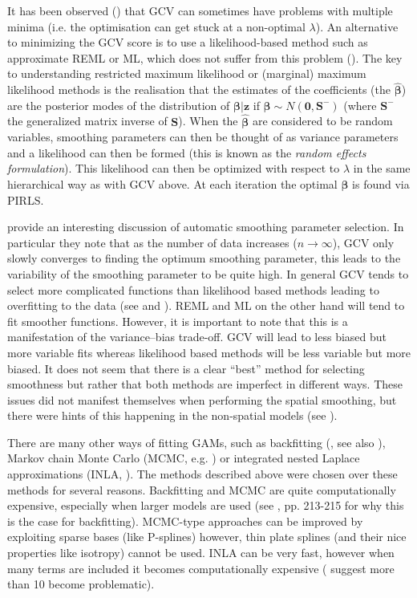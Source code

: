 It has been observed (\cite{reissogden}) that GCV can sometimes have problems with multiple minima (i.e. the optimisation can get stuck at a non-optimal $\lambda$). An alternative to minimizing the GCV score is to use a likelihood-based method such as approximate REML or ML, which does not suffer from this problem (\cite{remlpaper}). The key to understanding restricted maximum likelihood or (marginal) maximum likelihood methods is the realisation that the estimates of the coefficients (the $\bm{\hat{\beta}}$) are the posterior modes of the distribution of $\bm{\beta}|\mathbf{z}$ if $\bm{\beta} \sim N(\mathbf{0},\mathbf{S}^-)$ (where $\mathbf{S}^-$ the generalized matrix inverse of $\mathbf{S}$). When the $\bm{\hat{\beta}}$ are considered to be random variables, smoothing parameters can then be thought of as variance parameters and a likelihood can then be formed (this is known as the \textit{random effects formulation}).  This likelihood can then be optimized with respect to $\lambda$ in the same hierarchical way as with GCV above. At each iteration the optimal $\bm{\beta}$ is found via PIRLS.

 provide an interesting discussion of automatic smoothing parameter selection. In particular they note that as the number of data increases ($n\rightarrow\infty$), GCV only slowly converges to finding the optimum smoothing parameter, this leads to the variability of the smoothing parameter to be quite high. In general GCV tends to select more complicated functions than likelihood based methods leading to overfitting to the data (see \cite{remlpaper} and \cite{reissogden}). REML and ML on the other hand will tend to fit smoother functions. However, it is important to note that this is a manifestation of the variance--bias trade-off. GCV will lead to less biased but more variable fits whereas likelihood based methods will be less variable but more biased. It does not seem that there is a clear ``best'' method for selecting smoothness but rather that both methods are imperfect in different ways. These issues did not manifest themselves when performing the spatial smoothing, but there were hints of this happening in the non-spatial models (see ).

There are many other ways of fitting GAMs, such as backfitting (\cite{gammonograph}, see also ), Markov chain Monte Carlo (MCMC, e.g. \cite{fahrmeir2004}) or integrated nested Laplace approximations (INLA, \cite{inla}). The methods described above were chosen over these methods for several reasons. Backfitting and MCMC are quite computationally expensive, especially when larger models are used (see \cite{simonbook}, pp. 213-215 for why this is the case for backfitting). MCMC-type approaches can be improved by exploiting sparse bases (like P-splines) however, thin plate splines (and their nice properties like isotropy) cannot be used. INLA can be very fast, however when many terms are included it becomes computationally expensive (\cite{inla} suggest more than 10 become problematic).

